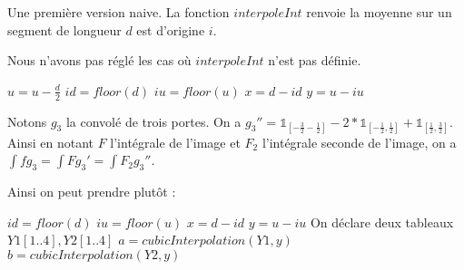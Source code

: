 
Une première version naive. La fonction $interpoleInt$ renvoie la moyenne sur un segment de longueur $d$ est d'origine $i$.

Nous n'avons pas réglé les cas où $interpoleInt$ n'est pas définie.

\begin{algorithm}[H]
\caption{$interpole(imgint,u,d)$}
$u=u-\frac{d}{2}$\;
$id=floor(d)$\;
$iu=floor(u)$\;
$x = d-id$\;
$y = u-iu$\;
\end{algorithm}

\begin{algorithm}[H]
\caption{$interpoleInt(imgint,i,d)$}
\end{algorithm}



Notons $g_3$ la convolé de trois portes. On a $g_3'' = \mathds{1}_{[-\frac{3}{2} -\frac{1}{2}]}-2*\mathds{1}_{[-\frac{1}{2},\frac{1}{2}]}+\mathds{1}_{[\frac{1}{2},\frac{3}{2}]}$.
Ainsi en notant $F$ l'intégrale de l'image et $F_2$ l'intégrale seconde de l'image, on a $\int f g_3 = \int F g_3' = \int F_2 g_3''$.

Ainsi on peut prendre plutôt : 

\begin{algorithm}[H]
\caption{$interpole3(imgint3,u,d)$}
$id=floor(d)$\;
$iu=floor(u)$\;
$x = d-id$\;
$y = u-iu$\;
On déclare deux tableaux $Y1[1..4],Y2[1..4]$\;
$a=cubicInterpolation(Y1,y)$\;
$b=cubicInterpolation(Y2,y)$\;
\end{algorithm}

